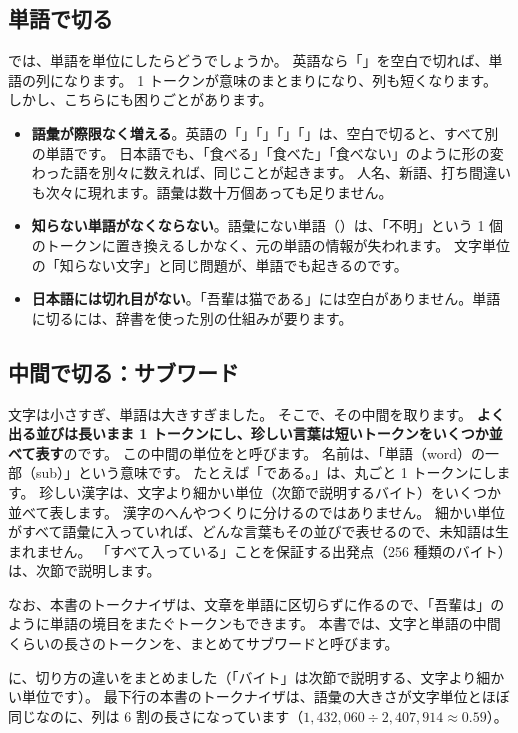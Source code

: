 \subsection*{単語で切る}

では、単語を単位にしたらどうでしょうか。
英語なら「」を空白で切れば、単語の列になります。
1 トークンが意味のまとまりになり、列も短くなります。
しかし、こちらにも困りごとがあります。

\begin{itemize}
\item \textbf{語彙が際限なく増える}。英語の「」「」「」「」は、空白で切ると、すべて別の単語です。
日本語でも、「食べる」「食べた」「食べない」のように形の変わった語を別々に数えれば、同じことが起きます。
人名、新語、打ち間違いも次々に現れます。語彙は数十万個あっても足りません。
\item \textbf{知らない単語がなくならない}。語彙にない単語（）は、「不明」という 1 個のトークンに置き換えるしかなく、元の単語の情報が失われます。
文字単位の「知らない文字」と同じ問題が、単語でも起きるのです。
\item \textbf{日本語には切れ目がない}。「吾輩は猫である」には空白がありません。単語に切るには、辞書を使った別の仕組みが要ります。
\end{itemize}

\subsection*{中間で切る：サブワード}

文字は小さすぎ、単語は大きすぎました。
そこで、その中間を取ります。
\textbf{よく出る並びは長いまま 1 トークンにし、珍しい言葉は短いトークンをいくつか並べて表す}のです。
この中間の単位をと呼びます。
名前は、「単語（word）の一部（sub）」という意味です。
たとえば「である。」は、丸ごと 1 トークンにします。
珍しい漢字は、文字より細かい単位（次節で説明するバイト）をいくつか並べて表します。
漢字のへんやつくりに分けるのではありません。
細かい単位がすべて語彙に入っていれば、どんな言葉もその並びで表せるので、未知語は生まれません。
「すべて入っている」ことを保証する出発点（256 種類のバイト）は、次節で説明します。

なお、本書のトークナイザは、文章を単語に区切らずに作るので、「吾輩は」のように単語の境目をまたぐトークンもできます。
本書では、文字と単語の中間くらいの長さのトークンを、まとめてサブワードと呼びます。

に、切り方の違いをまとめました（「バイト」は次節で説明する、文字より細かい単位です）。
最下行の本書のトークナイザは、語彙の大きさが文字単位とほぼ同じなのに、列は 6 割の長さになっています（$1{,}432{,}060\div2{,}407{,}914\approx0.59$）。

